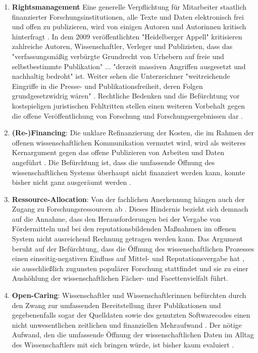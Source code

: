 \begin{enumerate}
\item \textbf{Rightsmanagement} Eine generelle Verpflichtung für Mitarbeiter staatlich finanzierter Forschungsinstitutionen, alle Texte und Daten elektronisch frei und offen zu publizieren, wird von einigen Autoren und Autorinnen kritisch hinterfragt \cite{Peukert_2013}. In dem 2009 veröffentlichten "Heidelberger Appell" \cite{Heidelberger_Appell_2009} kritisieren zahlreiche Autoren, Wissenschaftler, Verleger und Publizisten, dass das "verfassungsmäßig verbürgte Grundrecht von Urhebern auf freie und selbstbestimmte Publikation" ... "derzeit massiven Angriffen ausgesetzt und nachhaltig bedroht" ist. Weiter sehen die Unterzeichner "weitreichende Eingriffe in die Presse- und Publikationsfreiheit, deren Folgen grundgesetzwidrig wären" \cite{ITK_2009}. Rechtliche Bedenken und die Befürchtung vor kostspieligen juristischen Fehltritten stellen einen weiteren Vorbehalt gegen die offene Veröffentlichung von Forschung und Forschungsergebnissen dar \cite{Weishaupt_2009}.
\item \textbf{(Re-)Financing}: Die unklare Refinanzierung der Kosten, die im Rahmen der offenen wissenschaftlichen Kommunikation vermutet wird, wird als weiteres Kernargument gegen das offene Publizieren von Arbeiten und Daten angeführt \cite{Chibnik_2015}. Die Befürchtung ist, dass die umfassende Öffnung des wissenschaftlichen Systems überhaupt nicht finanziert werden kann, konnte bisher nicht ganz ausgeräumt werden \cite{Weishaupt_2009}.
\item \textbf{Ressource-Allocation}: Von der fachlichen Anerkennung hängen auch der Zugang zu Forschungsressourcen ab \cite[:14]{Buss_2001}. Dieses Hindernis bezieht sich demnach auf die Annahme, dass den Herausforderungen bei der Vergabe von Fördermitteln und bei den reputationsbildenden Maßnahmen im offenen System nicht ausreichend Rechnung getragen werden kann. Das Argument beruht auf der Befürchtung, dass die Öffnung des wissenschaftlichen Prozesses einen einseitig-negativen Einfluss auf Mittel- und Reputationsvergabe hat \cite{Grand_2012}, sie ausschließlich zugunsten populärer Forschung stattfindet und sie zu einer Aushöhlung der wissenschaftlichen Fächer- und Facettenvielfalt führt.
\item \textbf{Open-Caring}: Wissenschaftler und Wissenschaftlerinnen befürchten durch den Zwang zur umfassenden Bereitstellung ihrer Publikationen und gegebenenfalls sogar der Quelldaten sowie des genutzten Softwarecodes einen nicht unwesentlichen zeitlichen und finanziellen Mehraufwand \cite{BBAW_2015} \cite{Mennes_2013} \cite{Grand_2012}. Der nötige Aufwand, den die umfassende Öffnung der wissenschaftlichen Daten im Alltag des Wissenschaftlers mit sich bringen würde, ist bisher kaum evaluiert \cite{Osterloh_2008}.

\end{enumerate}
